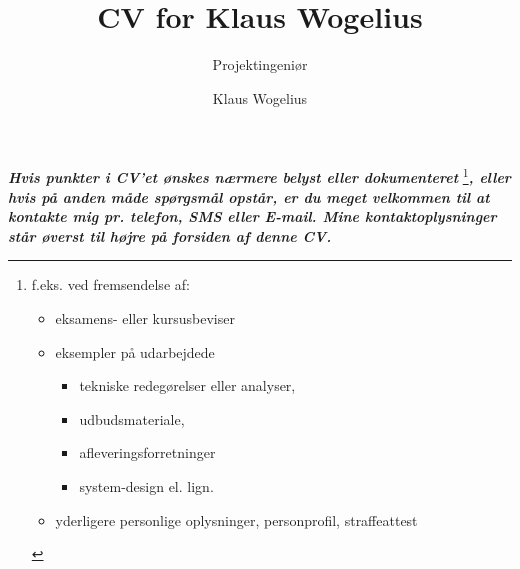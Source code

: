 \documentclass[10pt,twoside,a4paper]{curve} %
\title{CV for Klaus Wogelius}
\subtitle{Projektingeniør}
\author{Klaus Wogelius}
\begin{document}
\makeheaders 
\maketitle
{}
\pagebreak
{}
\pagebreak
{}
\vfill %
\textbf{\textit{Hvis punkter i CV'et ønskes nærmere belyst eller dokumenteret}}
\footnote{
f.eks. ved fremsendelse af:
\begin{itemize}
\item eksamens- eller kursusbeviser
\item eksempler på udarbejdede 
\begin{itemize}
\item tekniske redegørelser eller analyser,
\item udbudsmateriale,
\item afleveringsforretninger
\item system-design el. lign.
\end{itemize}
\item yderligere personlige oplysninger, personprofil, straffeattest
\end{itemize}
}\textbf{\textit{, eller hvis på anden måde spørgsmål opstår, er du meget velkommen til at kontakte mig pr. telefon, SMS eller E-mail. Mine kontaktoplysninger står øverst til højre på forsiden af denne CV.}}
\vspace{10mm}
%
%
\end{document}
